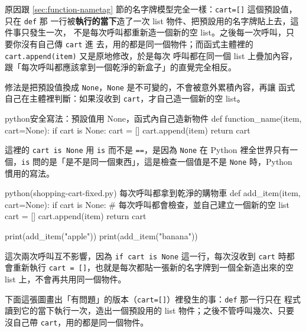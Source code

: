 原因跟 \ref{sec:function-nametag} 節的名字牌模型完全一樣：\texttt{cart=[]} 這個預設值，只在 \texttt{def} 那
一行被\textbf{執行的當下}造了一次 list 物件、把預設用的名字牌貼上去，這件事只發生一次，
不是每次呼叫都重新造一個新的空 list。之後每一次呼叫，只要你沒有自己傳 \texttt{cart} 進
去，用的都是同一個物件；而函式主體裡的 \texttt{cart.append(item)} 又是原地修改，於是每次
呼叫都在同一個 list 上疊加內容，跟「每次呼叫都應該拿到一個乾淨的新盒子」的直覺完全相反。

修法是把預設值換成 \texttt{None}，\texttt{None} 是不可變的，不會被意外累積內容，再讓
函式自己在主體裡判斷：如果沒收到 \texttt{cart}，才自己造一個新的空 list。

\begin{code}{python}{安全寫法：預設值用 None，函式內自己造新物件}
def function_name(item, cart=None):
    if cart is None:
        cart = []
    cart.append(item)
    return cart
\end{code}

這裡的 \texttt{cart is None} 用 \texttt{is} 而不是 \texttt{==}，是因為 \texttt{None}
在 Python 裡全世界只有一個，\texttt{is} 問的是「是不是同一個東西」，這是檢查一個值是不是
\texttt{None} 時，Python 慣用的寫法。

\begin{example}{python}{(shopping-cart-fixed.py) 每次呼叫都拿到乾淨的購物車}
def add_item(item, cart=None):
    if cart is None:        # 每次呼叫都會檢查，並自己建立一個新的空 list
        cart = []
    cart.append(item)
    return cart


print(add_item("apple"))
print(add_item("banana"))
\end{example}

\iosample{}{['apple'] \\{} ['banana'] \\}

這次兩次呼叫互不影響，因為 \texttt{if cart is None} 這一行，每次沒收到 \texttt{cart}
時都會重新執行 \texttt{cart = []}，也就是每次都貼一張新的名字牌到一個全新造出來的空 list
上，不會再共用同一個物件。

下面這張圖畫出「有問題」的版本（\texttt{cart=[]}）裡發生的事：\texttt{def} 那一行只在
程式讀到它的當下執行一次，造出一個預設用的 list 物件；之後不管呼叫幾次、只要沒自己帶
\texttt{cart}，用的都是同一個物件。

\begin{center}
\end{center}

